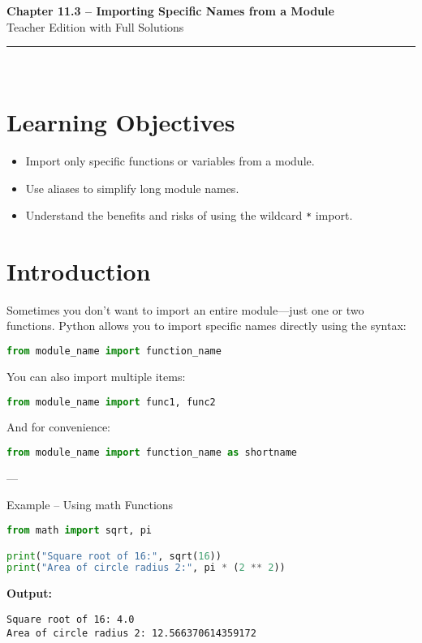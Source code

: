 \documentclass[12pt]{article}
\begin{document}
\begin{center}
  \vspace*{1cm}
  {\Huge \textbf{Chapter 11.3 – Importing Specific Names from a Module}}\\[0.5cm]
  {\Large Teacher Edition with Full Solutions}\\[1cm]
  \rule{\textwidth}{0.4pt}\\[1cm]
\end{center}

\section{Learning Objectives}
\begin{itemize}
  \item Import only specific functions or variables from a module.
  \item Use aliases to simplify long module names.
  \item Understand the benefits and risks of using the wildcard \texttt{*} import.
\end{itemize}

\section{Introduction}
Sometimes you don’t want to import an entire module—just one or two functions.  
Python allows you to import specific names directly using the syntax:
\begin{lstlisting}[language=Python]
from module_name import function_name
\end{lstlisting}

You can also import multiple items:
\begin{lstlisting}[language=Python]
from module_name import func1, func2
\end{lstlisting}

And for convenience:
\begin{lstlisting}[language=Python]
from module_name import function_name as shortname
\end{lstlisting}

---

\begin{conceptbox}{Example – Using math Functions}
\begin{lstlisting}[language=Python]
from math import sqrt, pi

print("Square root of 16:", sqrt(16))
print("Area of circle radius 2:", pi * (2 ** 2))
\end{lstlisting}

\textbf{Output:}
\begin{lstlisting}
Square root of 16: 4.0
Area of circle radius 2: 12.566370614359172
\end{lstlisting}
\end{conceptbox}
\end{document}
